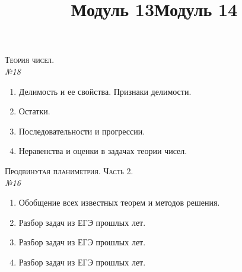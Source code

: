 \documentclass[12pt, a4paper]{article}
\begin{document}
\newpage
\title{Модуль 13}
\textsc{Теория чисел.}\\[0.5em]
\textit{№18}
\begin{enumerate}[label=\textbf{\arabic*})]
	\item Делимость и ее свойства. Признаки делимости.
	\item Остатки.
	\item Последовательности и прогрессии.
	\item Неравенства и оценки в задачах теории чисел.
\end{enumerate}
\title{Модуль 14}
\textsc{Продвинутая планиметрия. Часть 2.}\\[0.5em]
\textit{№16}
\begin{enumerate}[label=\textbf{\arabic*})]
	\item Обобщение всех известных теорем и методов решения.
	\item Разбор задач из ЕГЭ прошлых лет.
	\item Разбор задач из ЕГЭ прошлых лет.
	\item Разбор задач из ЕГЭ прошлых лет.
\end{enumerate}
\end{document}
